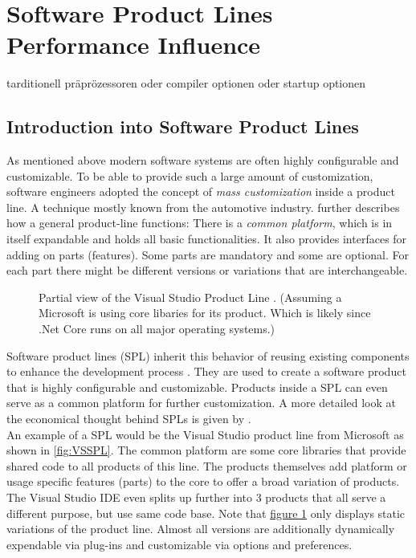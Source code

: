 \section{Software Product Lines Performance Influence}

tarditionell präprözessoren oder compiler optionen oder startup optionen

\subsection{Introduction into Software Product Lines}

As mentioned above modern software systems are often highly configurable and customizable. To be able to provide such a large amount of customization, software engineers adopted the concept of \textit{mass customization} inside a product line. A technique mostly known from the automotive industry\cite{SPLEngineering}.\cite{SPLEngineering} further describes how a general product-line functions: There is a \textit{common platform}, which is in itself expandable and holds all basic functionalities. It also provides interfaces for adding on parts (features). Some parts are mandatory and some are optional. For each part there might be different versions or variations that are interchangeable.\\

\begin{figure}%
	\centering
	\setlength\belowcaptionskip{-\baselineskip}
	\captionsetup{width=0.95\linewidth}
	
	\caption{Partial view of the Visual Studio Product Line \cite{VisualStudioSPL}. (Assuming a Microsoft is using core libaries for its product. Which is likely since .Net Core runs on all major operating systems.) }
	\label{fig:VSSPL}
\end{figure}\noindent
Software product lines (SPL) inherit this behavior of reusing existing components to enhance the development process \cite{IssuesAndModelsInSPL}. They are used to create a software product that is highly configurable and customizable. Products inside a SPL can even serve as a common platform for further customization. A more detailed look at the economical thought behind SPLs is given by \citet{IssuesAndModelsInSPL}.\\
An example of a SPL would be the Visual Studio product line from Microsoft as shown in \autoref{fig:VSSPL}. The common platform are some core libraries that provide shared code to all products of this line. The products themselves add platform or usage specific features (parts) to the core to offer a broad variation of products. The Visual Studio IDE even splits up further into 3 products that all serve a different purpose, but use same code base. Note that \hyperref[fig:VSSPL]{figure 1} only displays static variations of the product line. Almost all versions are additionally dynamically expendable via plug-ins and customizable via options and preferences.

